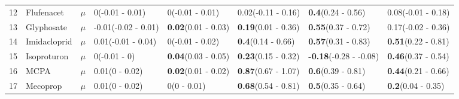 \begin{longtable}{lp{2cm}p{0.7cm}p{2cm}p{2cm}p{2cm}p{2cm}p{2cm}}
  12 & Flufenacet & $\mu$ & 0\newline (-0.01 - 0.01) & 0\newline (-0.01 - 0.01) & 0.02\newline (-0.11 - 0.16) & \textbf{0.4}\newline (0.24 - 0.56) & 0.08\newline (-0.01 - 0.18) \\ 
  13 & Glyphosate & $\mu$ & -0.01\newline (-0.02 - 0.01) & \textbf{0.02}\newline (0.01 - 0.03) & \textbf{0.19}\newline (0.01 - 0.36) & \textbf{0.55}\newline (0.37 - 0.72) & 0.17\newline (-0.02 - 0.36) \\ 
  14 & Imidacloprid & $\mu$ & 0.01\newline (-0.01 - 0.04) & 0\newline (-0.01 - 0.02) & \textbf{0.4}\newline (0.14 - 0.66) & \textbf{0.57}\newline (0.31 - 0.83) & \textbf{0.51}\newline (0.22 - 0.81) \\ 
  15 & Isoproturon & $\mu$ & 0\newline (-0.01 - 0) & \textbf{0.04}\newline (0.03 - 0.05) & \textbf{0.23}\newline (0.15 - 0.32) & \textbf{-0.18}\newline (-0.28 - -0.08) & \textbf{0.46}\newline (0.37 - 0.54) \\ 
  16 & MCPA & $\mu$ & 0.01\newline (0 - 0.02) & \textbf{0.02}\newline (0.01 - 0.02) & \textbf{0.87}\newline (0.67 - 1.07) & \textbf{0.6}\newline (0.39 - 0.81) & \textbf{0.44}\newline (0.21 - 0.66) \\ 
  17 & Mecoprop & $\mu$ & 0.01\newline (0 - 0.02) & 0\newline (0 - 0.01) & \textbf{0.68}\newline (0.54 - 0.81) & \textbf{0.5}\newline (0.35 - 0.64) & \textbf{0.2}\newline (0.04 - 0.35) \\ 

\end{longtable}
